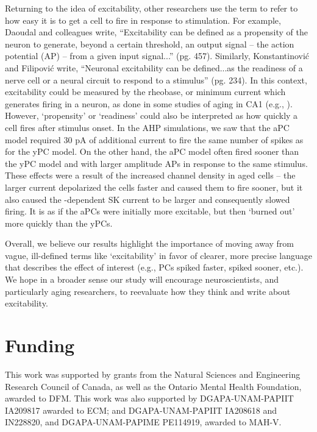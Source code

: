 \documentclass[12pt]{article}
\begin{document}
Returning to the idea of excitability, other researchers use the term to refer to how easy it is to get a cell to fire in response to stimulation. For example, Daoudal and colleagues \cite{daoudal2003long} write, ``Excitability can be defined as a propensity of the neuron to generate, beyond a certain threshold, an output signal -- the action potential (AP) -- from a given input signal...'' (pg. 457). Similarly, Konstantinovi{\'c} and Filipovi{\'c} \cite{konstantinovic2019effects} write, ``Neuronal excitability can be defined...as the readiness of a nerve cell or a neural circuit to respond to a stimulus'' (pg. 234). In this context, excitability could be measured by the rheobase, or minimum current which generates firing in a neuron, as done in some studies of aging in CA1 (e.g., \cite{potier1993age}). However, `propensity' or `readiness' could also be interpreted as how quickly a cell fires after stimulus onset. In the AHP simulations, we saw that the aPC model  required 30 pA of additional current to fire the same number of spikes as for the yPC model. On the other hand, the aPC model often fired sooner than the yPC model and with larger amplitude APs in response to the same stimulus. These effects were a result of the increased {\Ca} channel density in aged cells -- the larger {\Ca} current depolarized the cells faster and caused them to fire sooner, but it also caused the {\Ca}-dependent SK current to be larger and consequently slowed firing. It is as if the aPCs were initially more excitable, but then `burned out' more quickly than the yPCs. 

Overall, we believe our results highlight the importance of moving away from vague, ill-defined terms like `excitability' in favor of clearer, more precise language that describes the effect of interest (e.g., PCs spiked faster, spiked sooner, etc.). We hope in a broader sense our study will encourage neuroscientists, and particularly aging researchers, to reevaluate how they think and write about excitability.

\section*{Funding} 
This work was supported by grants from the Natural Sciences and Engineering Research Council of Canada, as well as the Ontario Mental Health Foundation, awarded to DFM. This work was also supported by DGAPA-UNAM-PAPIIT IA209817 awarded to ECM; and DGAPA-UNAM-PAPIIT IA208618 and IN228820, and DGAPA-UNAM-PAPIME PE114919, awarded to MAH-V.   
 
 
\begin{small}


\end{small}
\end{document}
